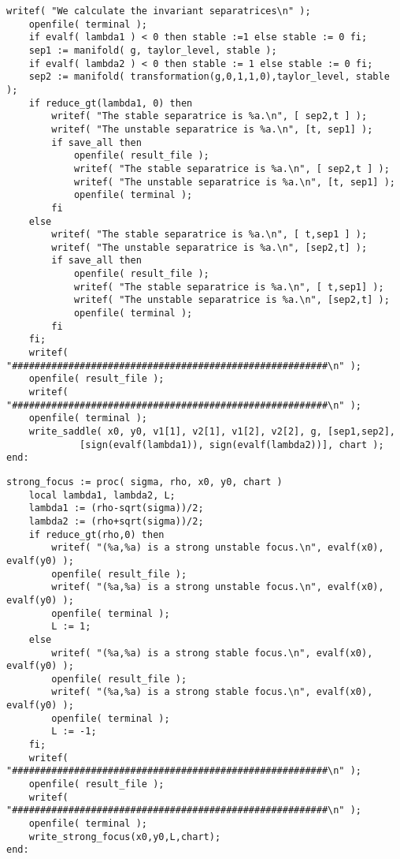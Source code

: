 \documentclass[a4paper,10pt]{article}
\begin{document}
\begin{lstlisting}[name=type]
    writef( "We calculate the invariant separatrices\n" );
    openfile( terminal );
    if evalf( lambda1 ) < 0 then stable :=1 else stable := 0 fi;
    sep1 := manifold( g, taylor_level, stable );
    if evalf( lambda2 ) < 0 then stable := 1 else stable := 0 fi;
    sep2 := manifold( transformation(g,0,1,1,0),taylor_level, stable );
    if reduce_gt(lambda1, 0) then
        writef( "The stable separatrice is %a.\n", [ sep2,t ] );
        writef( "The unstable separatrice is %a.\n", [t, sep1] );
        if save_all then
            openfile( result_file );
            writef( "The stable separatrice is %a.\n", [ sep2,t ] );
            writef( "The unstable separatrice is %a.\n", [t, sep1] );
            openfile( terminal );
        fi
    else
        writef( "The stable separatrice is %a.\n", [ t,sep1 ] );
        writef( "The unstable separatrice is %a.\n", [sep2,t] );
        if save_all then
            openfile( result_file );
            writef( "The stable separatrice is %a.\n", [ t,sep1] );
            writef( "The unstable separatrice is %a.\n", [sep2,t] );
            openfile( terminal );
        fi
    fi;
    writef( "########################################################\n" );
    openfile( result_file );
    writef( "########################################################\n" );
    openfile( terminal );
    write_saddle( x0, y0, v1[1], v2[1], v1[2], v2[2], g, [sep1,sep2],
             [sign(evalf(lambda1)), sign(evalf(lambda2))], chart );
end:
\end{lstlisting}

\begin{lstlisting}[name=type]
strong_focus := proc( sigma, rho, x0, y0, chart )
    local lambda1, lambda2, L;
    lambda1 := (rho-sqrt(sigma))/2;
    lambda2 := (rho+sqrt(sigma))/2;
    if reduce_gt(rho,0) then
        writef( "(%a,%a) is a strong unstable focus.\n", evalf(x0), evalf(y0) );
        openfile( result_file );
        writef( "(%a,%a) is a strong unstable focus.\n", evalf(x0), evalf(y0) );
        openfile( terminal );
        L := 1;
    else
        writef( "(%a,%a) is a strong stable focus.\n", evalf(x0), evalf(y0) );
        openfile( result_file );
        writef( "(%a,%a) is a strong stable focus.\n", evalf(x0), evalf(y0) );
        openfile( terminal );
        L := -1;
    fi;
    writef( "########################################################\n" );
    openfile( result_file );
    writef( "########################################################\n" );
    openfile( terminal );
    write_strong_focus(x0,y0,L,chart);
end:
\end{lstlisting}
\end{document}
